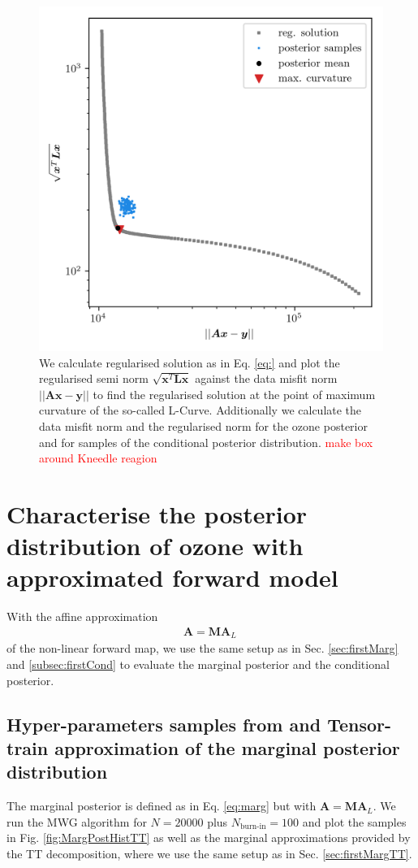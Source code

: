 \begin{figure}[ht!]
	\centering
	\includegraphics{LCurvePhD.png}
	\caption[Plot of the L-curve to find the regularised solution.]{We calculate regularised solution as in Eq. \ref{eq:} and plot the regularised semi norm $\sqrt{\bm{x}^T\bm{Lx}}$ against the data misfit norm $||\bm{Ax} -\bm{y} ||$ to find the regularised solution at the point of maximum curvature of the so-called L-Curve. Additionally we calculate the data misfit norm and the regularised norm for the ozone posterior and for samples of the conditional posterior distribution. \textcolor{red}{make box around Kneedle reagion}}
	\label{fig:LCurve}
\end{figure}


\section{Characterise the posterior distribution of ozone with approximated forward model}
With the affine approximation
\begin{align}
	\bm{A} =  \bm{M A}_L \, 
\end{align}
of the non-linear forward map, we use the same setup as in Sec. \ref{sec:firstMarg} and \ref{subsec:firstCond} to evaluate the marginal posterior and the conditional posterior.

\subsection{Hyper-parameters samples from and Tensor-train approximation of the marginal posterior distribution}
The marginal posterior is defined as in Eq. \ref{eq:marg} but with $ \bm{A} =  \bm{M A}_L$.
We run the MWG algorithm for $N = 20000$ plus $N_{\text{burn-in}} = 100$ and plot the samples in Fig. \ref{fig:MargPostHistTT} as well as the marginal approximations provided by the TT decomposition, where we use the same setup as in Sec. \ref{sec:firstMargTT}.

